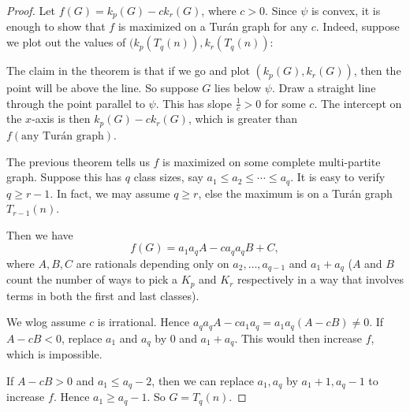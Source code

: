 \documentclass[a4paper]{article}
\begin{document}
\begin{proof}
  Let $f(G) = k_p(G) - c k_r(G)$, where $c > 0$. Since $\psi$ is convex, it is enough to show that $f$ is maximized on a Tur\'an graph for any $c$. Indeed, suppose we plot out the values of $(k_p(T_q(n)), k_r(T_q(n))$:
  \begin{center}
  \end{center}
  The claim in the theorem is that if we go and plot $(k_p(G), k_r(G))$, then the point will be above the line. So suppose $G$ lies below $\psi$. Draw a straight line through the point parallel to $\psi$. This has slope $\frac{1}{c} > 0$ for some $c$. The intercept on the $x$-axis is then $k_p(G) - c k_r(G)$, which is greater than $f(\text{any Tur\'an graph})$.

  The previous theorem tells us $f$ is maximized on some complete multi-partite graph. Suppose this has $q$ class sizes, say $a_1 \leq a_2 \leq \cdots \leq a_q$. It is easy to verify $q \geq r - 1$. In fact, we may assume $q \geq r$, else the maximum is on a Tur\'an graph $T_{r - 1}(n)$.

  Then we have
  \[
    f(G) = a_1 a_q A - c a_q a_q B + C,
  \]
  where $A, B, C$ are rationals depending only on $a_2, \ldots, a_{q - 1}$ and $a_1 + a_q$ ($A$ and $B$ count the number of ways to pick a $K_p$ and $K_r$ respectively in a way that involves terms in both the first and last classes).

  We wlog assume $c$ is irrational. Hence $a_q a_q A - c a_1 a_q = a_1 a_q (A - cB) \not= 0$. If $A - cB < 0$, replace $a_1$ and $a_q$ by $0$ and $a_1 + a_q$. This would then increase $f$, which is impossible.

  If $A - cB > 0$ and $a_1 \leq a_q - 2$, then we can replace $a_1, a_q$ by $a_1 + 1, a_q - 1$ to increase $f$. Hence $a_1 \geq a_q - 1$. So $G = T_q(n)$.
\end{proof}
\end{document}
